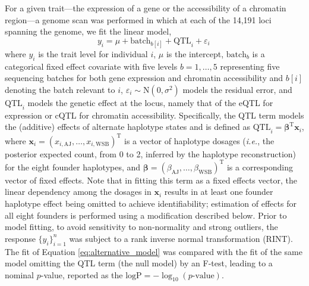 \documentclass[9pt,twocolumn,twoside]{gsajnl}
\newcommand{\eg}{\emph{e.g.}\xspace}
\newcommand{\ie}{\emph{i.e.}\xspace}
\newcommand{\T}{^\mathrm{T}}
\newcommand{\bbeta}{\boldsymbol{\beta}}
\newcommand{\bx}{\mathbf{x}}
\begin{document}
For a given trait---the expression of a gene or the accessibility of a chromatin region---a genome scan was performed in which at each of the 14,191 loci spanning the genome, we fit the linear model,
\begin{equation}
  y_i = \mu + \text{batch}_{b[i]} + \text{QTL}_i + \varepsilon_i\, 
  \label{eq:alternative_model}
\end{equation}
where $y_{i}$ is the trait level for individual $i$, $\mu$ is the intercept, $\text{batch}_b$ is a categorical fixed effect covariate with five levels $b=1,\dots,5$ representing five sequencing batches for both gene expression and chromatin accessibility and $b[i]$ denoting the batch relevant to $i$, $\varepsilon_i\sim\text{N}(0,\sigma^2)$ models the residual error, and $\text{QTL}_{i}$ models the genetic effect at the locus, namely that of the eQTL for expression or cQTL for chromatin accessibility. Specifically, the QTL term models the (additive) effects of alternate haplotype states and is defined as $\text{QTL}_{i}=\bbeta\T\bx_i$, where $\bx_i=(x_{i,\text{AJ}},\dots,x_{i,\text{WSB}})\T$ is a vector of haplotype dosages (\ie, the posterior expected count, from 0 to 2, inferred by the haplotype reconstruction) for the eight founder haplotypes, and $\bbeta=(\beta_\text{AJ},\dots,\beta_\text{WSB})\T$ is a corresponding vector of fixed effects. Note that in fitting this term as a fixed effects vector, the linear dependency among the dosages in $\bx_i$ results in at least one founder haplotype effect being omitted to achieve identifiability; estimation of effects for all eight founders is performed using a modification described below. Prior to model fitting, to avoid sensitivity to non-normality and strong outliers, the response $\{y_i\}^n_{i=1}$ was subject to a rank inverse normal transformation (RINT).
The fit of Equation \ref{eq:alternative_model} was compared with the fit of the same model omitting the QTL term (the null model) by an F-test, leading to a nominal $p$-value, reported as the $\text{logP}=-\log_{10}(\text{$p$-value})$. %

\end{document}
